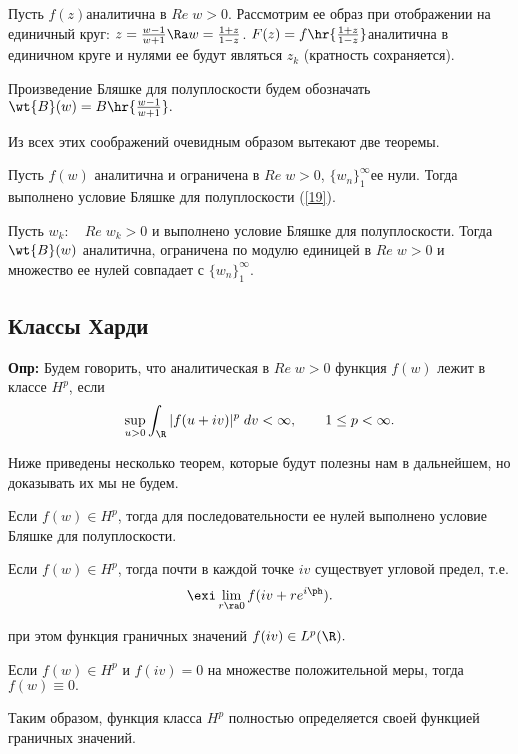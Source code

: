 \documentclass[a4paper]{article}
\begin{document}
Пусть $f(z)$\т аналитична в $Re\;w>0$. Рассмотрим ее образ при
отображении на единичный круг: $z=\frac{w-1}{w+1}\Ra
w=\frac{1+z}{1-z}$. $F(z)=f\hr{\frac{1+z}{1-z}}$\т аналитична в единичном круге и нулями ее будут являться $z_k$
(кратность сохраняется).

Произведение Бляшке для полуплоскости будем обозначать
$\wt{B}(w)=B\hr{\frac{w-1}{w+1}}.$

Из всех этих соображений очевидным образом вытекают две теоремы.

\begin{theorems}
Пусть $f(w)$ аналитична и ограничена в $Re\;w>0$, $\{w_n\}_1^{\infty}$\т ее нули. Тогда выполнено условие
Бляшке для полуплоскости (\ref{19}).
\end{theorems}

\begin{theorems}\label{B}
Пусть $w_k: \quad Re\;w_k>0$ и выполнено условие Бляшке для
полуплоскости. Тогда $\wt{B}(w)$ аналитична, ограничена по
модулю единицей в $Re\;w>0$ и множество ее нулей совпадает с
$\{w_n\}_1^{\infty}$.
\end{theorems}

\subsection{Классы Харди}
\textbf{Опр:} Будем говорить, что аналитическая в $Re\;w>0$
функция $f(w)$ лежит в классе $H^p$, если
\begin{equation}
\sup_{u>0}\int_{\R } |f(u+iv)|^p\;dv<\infty,\qquad1\le
p<\infty.
\end{equation}

Ниже приведены несколько теорем, которые будут полезны нам в
дальнейшем, но доказывать их мы не будем.
\begin{theorems}
Если $f(w)\in H^p$, тогда для последовательности ее нулей
выполнено условие Бляшке для полуплоскости.
\end{theorems}

\begin{theorems}
Если $f(w)\in H^p$, тогда почти в каждой точке $iv$ существует
угловой предел, т.е.
$$\exi \lim_{r\ra
0}f(iv+re^{i\ph}).$$

при этом функция граничных значений $f(iv)\in L^p(\R ).$
\end{theorems}

\begin{theorems}[Единственности]
Если $f(w)\in H^p$ и $f(iv)=0$ на множестве положительной меры,
тогда $f(w)\equiv0.$
\end{theorems}
Таким образом, функция класса $H^p$ полностью определяется своей
функцией граничных значений.
\end{document}
